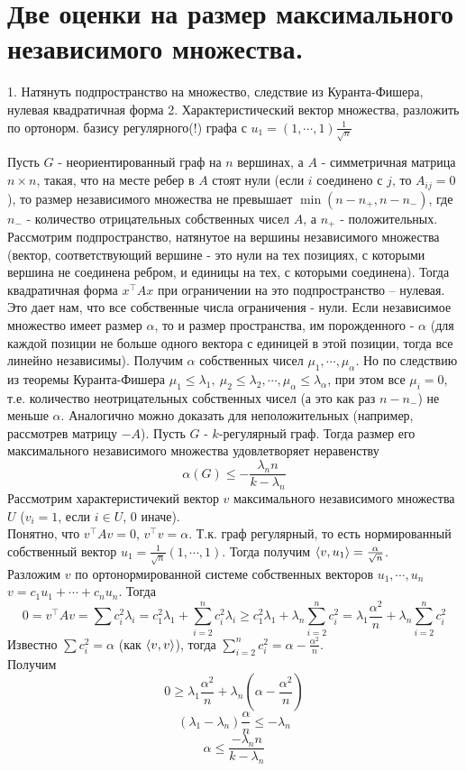 \section{
  Две оценки на размер максимального независимого множества.
}
    
    1. Натянуть подпространство на  множество, следствие из Куранта-Фишера, нулевая квадратичная форма
    2. Характеристический вектор множества, разложить по ортонорм. базису регулярного(!) графа с $u_1 = (1,\cdots,1) \frac{1}{\sqrt n}$
    
    
    \thrm Пусть $G$ - неориентированный граф на $n$ вершинах, а $A$ - симметричная матрица $n \times n$, такая, что на месте ребер в $A$ стоят нули (если $i$ соединено с $j$, то $A_{ij} = 0$), то размер независимого множества не превышает $\min(n - n_{+}, n-n_{-})$, где $n_{-}$ - количество отрицательных собственных чисел $A$, а $n_{+}$ - положительных.
    \ethrm
    \proof
    Рассмотрим подпространство, натянутое на вершины независимого множества (вектор, соответствующий вершине - это нули на тех позициях, с которыми вершина не соединена ребром, и единицы на тех, с которыми соединена). Тогда квадратичная форма $x^{\top}Ax$ при ограничении на это подпространство -- нулевая. Это дает нам, что все собственные числа ограничения - нули. Если независимое множество имеет размер $\alpha$, то и размер пространства, им порожденного - $\alpha$ (для каждой позиции не больше одного вектора с единицей в этой позиции, тогда все линейно независимы). Получим $\alpha$ собственных чисел $\mu_1, \cdots, \mu_{\alpha}$. Но по следствию из теоремы Куранта-Фишера $\mu_1 \le \lambda_1,\: \mu_2 \le \lambda_2, \cdots,\mu_{\alpha} \le \lambda_{\alpha}$, при этом все $\mu_i = 0$, т.е. количество неотрицательных собственных чисел (а это как раз $n - n_{-}$) не меньше $\alpha$. Аналогично можно доказать для неположительных (например, рассмотрев матрицу $-A$).
    \endproof
    \thrm Пусть $G$ - $k$-регулярный граф. Тогда размер его максимального независимого множества удовлетворяет неравенству
    $$\alpha(G) \le - \frac{\lambda_n n}{k - \lambda_n}$$
    \ethrm
    \proof
        Рассмотрим характеристичекий вектор $v$ максимального независимого множества $U$ ($v_i = 1$, если $i \in U$, 0 иначе).\\
        Понятно, что $v^{\top}Av = 0$, $v^{\top}v = \alpha$. Т.к. граф регулярный, то есть нормированный собственный вектор $u_1 = \frac{1}{\sqrt{n}}(1,\cdots,1)$. Тогда получим $\left\langle v, u_1 \right\rangle = \frac{\alpha}{\sqrt n}$.\\
        Разложим $v$ по ортонормированной системе собственных векторов $u_1, \cdots, u_n$ $v = c_1 u_1 + \cdots + c_n u_n$. Тогда
        $$0 = v^{\top}Av = \sum c_i^2 \lambda_i = c_1^2 \lambda_1 + \sum\limits_{i=2}^{n} c_i^2 \lambda_i \ge c_1^2 \lambda_1 + \lambda_n \sum\limits_{i=2}^{n} c_i^2 = \lambda_1 \frac{\alpha^2}{n} +\lambda_n \sum\limits_{i=2}^n c_i^2$$
        Известно $\sum c_i^2 = \alpha$ (как $\left\langle v,v \right\rangle$), тогда $\sum\limits_{i=2}^{n} c_i^2 = \alpha - \frac{\alpha^2}{n}$.\\ Получим $$0 \ge \lambda_1 \frac{\alpha^2}{n} + \lambda_n\left(\alpha - \frac{\alpha^2}{n}\right)$$
         $$(\lambda_1 - \lambda_n)\frac{\alpha}{n} \le -\lambda_n$$
         $$\alpha \le \frac{-\lambda_n n}{k - \lambda_n}$$
        
    \endproof

